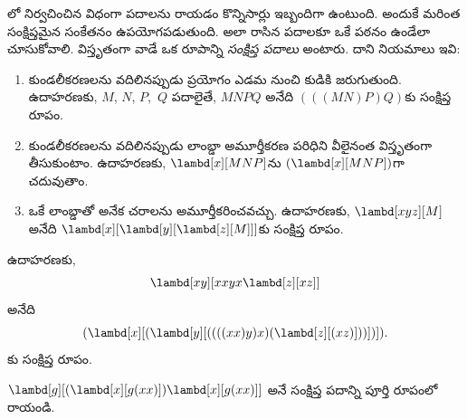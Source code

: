 \documentclass[../../../include/open-logic-section]{subfiles}
\begin{document}

లో నిర్వచించిన విధంగా పదాలను రాయడం కొన్నిసార్లు
ఇబ్బందిగా ఉంటుంది. అందుకే మరింత సంక్షిప్తమైన సంకేతనం ఉపయోగపడుతుంది.
అలా రాసిన పదాలకూ ఒకే పఠనం ఉండేలా చూసుకోవాలి. విస్తృతంగా వాడే ఒక రూపాన్ని \emph{సంక్షిప్త పదాలు} అంటారు.
దాని నియమాలు ఇవి:

\begin{enumerate}
\item కుండలీకరణలను వదిలినప్పుడు ప్రయోగం ఎడమ నుంచి కుడికి జరుగుతుంది.
  ఉదాహరణకు, $M$, $N$, $P$,~$Q$ పదాలైతే, $MNPQ$ అనేది
  $(((MN)P)Q)$కు సంక్షిప్త రూపం.
\item కుండలీకరణలను వదిలినప్పుడు లాంబ్డా అమూర్తీకరణ పరిధిని
  వీలైనంత విస్తృతంగా తీసుకుంటాం. ఉదాహరణకు, $\lambd[x][MNP]$ను
  $(\lambd[x][MNP])$గా చదువుతాం.
\item ఒకే లాంబ్డాతో అనేక చరాలను అమూర్తీకరించవచ్చు. ఉదాహరణకు,
  $\lambd[xyz][M]$ అనేది $\lambd[x][\lambd[y][\lambd[z][M]]]$కు
  సంక్షిప్త రూపం.
\end{enumerate}

ఉదాహరణకు,
\[
\lambd[xy][xxyx \lambd[z][xz]]
\]
అనేది
\[
(\lambd[x][(\lambd[y][((((xx)y)x)(\lambd[z][(xz)]))])]).
\]
కు సంక్షిప్త రూపం.

\begin{prob}
$\lambd[g][(\lambd[x][g (x x)])
  \lambd[x][g (x x)]]$ అనే సంక్షిప్త పదాన్ని పూర్తి రూపంలో రాయండి.
\end{prob}
\end{document}
